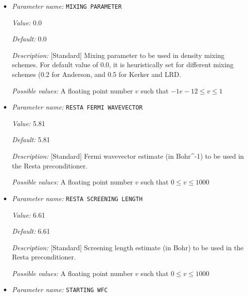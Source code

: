 \begin{itemize}
{\it Default:} ANDERSON


{\it Description:} [Standard] Method for density mixing. ANDERSON is the default option.


{\it Possible values:} Any one of ANDERSON, ANDERSON\_WITH\_KERKER, ANDERSON\_WITH\_RESTA, LOW\_RANK\_DIELECM\_PRECOND
\item {\it Parameter name:} {\tt MIXING PARAMETER}
\label{parameters:SCF parameters/MIXING PARAMETER}
\label{parameters:SCF_20parameters/MIXING_20PARAMETER}


{\it Value:} 0.0


{\it Default:} 0.0


{\it Description:} [Standard] Mixing parameter to be used in density mixing schemes. For default value of 0.0, it is heuristically set for different mixing schemes (0.2 for Anderson, and 0.5 for Kerker and LRD.


{\it Possible values:} A floating point number $v$ such that $-1e-12 \leq v \leq 1$
\item {\it Parameter name:} {\tt RESTA FERMI WAVEVECTOR}
\label{parameters:SCF parameters/RESTA FERMI WAVEVECTOR}
\label{parameters:SCF_20parameters/RESTA_20FERMI_20WAVEVECTOR}


{\it Value:} 5.81


{\it Default:} 5.81


{\it Description:} [Standard] Fermi wavevector estimate (in Bohr^-1) to be used in the Resta preconditioner.


{\it Possible values:} A floating point number $v$ such that $0 \leq v \leq 1000$
\item {\it Parameter name:} {\tt RESTA SCREENING LENGTH}
\label{parameters:SCF parameters/RESTA SCREENING LENGTH}
\label{parameters:SCF_20parameters/RESTA_20SCREENING_20LENGTH}


{\it Value:} 6.61


{\it Default:} 6.61


{\it Description:} [Standard] Screening length estimate (in Bohr) to be used in the Resta preconditioner.


{\it Possible values:} A floating point number $v$ such that $0 \leq v \leq 1000$
\item {\it Parameter name:} {\tt STARTING WFC}
\label{parameters:SCF parameters/STARTING WFC}
\label{parameters:SCF_20parameters/STARTING_20WFC}



\end{itemize}
